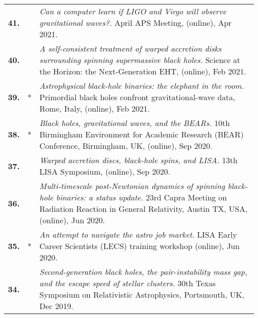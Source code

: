 {\begin{longtable}{rp{0.3cm}p{15.8cm}}
%
\textbf{41.} &  & \textit{Can a computer learn if LIGO and Virgo will observe gravitational waves?.}
\newline{}
April APS Meeting, (online), Apr 2021.
\vspace{0.05cm}\\
%
\textbf{40.} &  & \textit{A self-consistent treatment of warped accretion disks surrounding spinning supermassive black holes.}
\newline{}
Science at the Horizon: the Next-Generation EHT, (online), Feb 2021.
\vspace{0.05cm}\\
%
\textbf{39.} & * & \textit{Astrophysical black-hole binaries: the elephant in the room.}
\newline{}
Primordial black holes confront gravitational-wave data, Rome, Italy, (online), Feb 2021.
\vspace{0.05cm}\\
%
\textbf{38.} & * & \textit{Black holes, gravitational waves, and the BEARs.}
\newline{}
10th Birmingham Environment for Academic Research (BEAR) Conference, Birmingham, UK, (online), Sep 2020.
\vspace{0.05cm}\\
%
\textbf{37.} &  & \textit{Warped accretion discs, black-hole spins, and LISA.}
\newline{}
13th LISA Symposium, (online), Sep 2020.
\vspace{0.05cm}\\
%
\textbf{36.} &  & \textit{Multi-timescale post-Newtonian dynamics of spinning black-hole binaries: a status update.}
\newline{}
23rd Capra Meeting on Radiation Reaction in General Relativity, Austin TX, USA, (online), Jun 2020.
\vspace{0.05cm}\\
%
\textbf{35.} & * & \textit{An attempt to navigate the astro job market.}
\newline{}
LISA Early Career Scientists (LECS) training workshop (online), Jun 2020.
\vspace{0.05cm}\\
%
\textbf{34.} &  & \textit{Second-generation black holes, the pair-instability mass gap, and the escape speed of stellar clusters.}
\newline{}
30th Texas Symposium on Relativistic Astrophysics, Portsmouth, UK, Dec 2019.
\vspace{0.05cm}\\
%

\end{longtable}}
